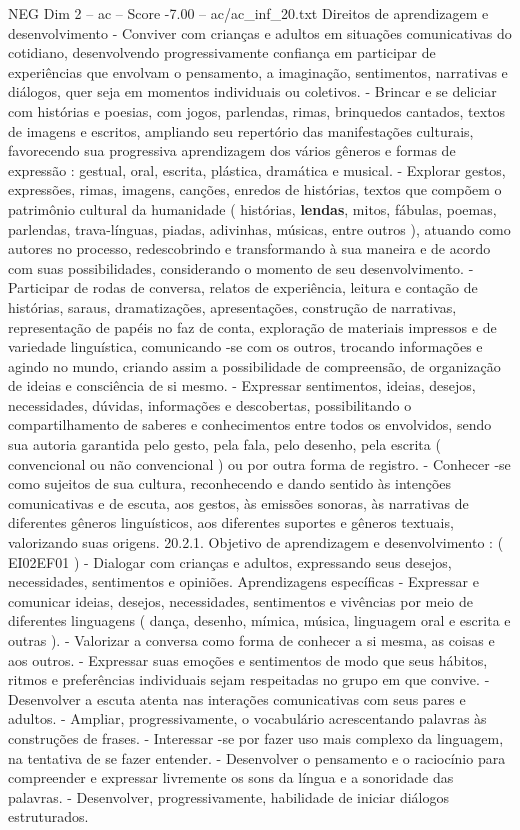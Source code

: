 \begin{textsample}{NEG Dim 2 – ac – Score -7.00 – ac/ac\_inf\_20.txt}
Direitos de aprendizagem e desenvolvimento - Conviver com crianças e adultos em situações comunicativas do cotidiano, desenvolvendo progressivamente confiança em participar de experiências que envolvam o pensamento, a imaginação, sentimentos, narrativas e diálogos, quer seja em momentos individuais ou coletivos. - Brincar e se deliciar com histórias e poesias, com jogos, parlendas, rimas, brinquedos cantados, textos de imagens e escritos, ampliando seu repertório das manifestações culturais, favorecendo sua progressiva aprendizagem dos vários gêneros e formas de expressão : gestual, oral, escrita, plástica, dramática e musical. - Explorar gestos, expressões, rimas, imagens, canções, enredos de histórias, textos que compõem o patrimônio cultural da humanidade ( histórias, \textbf{lendas}, mitos, fábulas, poemas, parlendas, trava-línguas, piadas, adivinhas, músicas, entre outros ), atuando como autores no processo, redescobrindo e transformando à sua maneira e de acordo com suas possibilidades, considerando o momento de seu desenvolvimento. - Participar de rodas de conversa, relatos de experiência, leitura e contação de histórias, saraus, dramatizações, apresentações, construção de narrativas, representação de papéis no faz de conta, exploração de materiais impressos e de variedade linguística, comunicando -se com os outros, trocando informações e agindo no mundo, criando assim a possibilidade de compreensão, de organização de ideias e consciência de si mesmo. - Expressar sentimentos, ideias, desejos, necessidades, dúvidas, informações e descobertas, possibilitando o compartilhamento de saberes e conhecimentos entre todos os envolvidos, sendo sua autoria garantida pelo gesto, pela fala, pelo desenho, pela escrita ( convencional ou não convencional ) ou por outra forma de registro. - Conhecer -se como sujeitos de sua cultura, reconhecendo e dando sentido às intenções comunicativas e de escuta, aos gestos, às emissões sonoras, às narrativas de diferentes gêneros linguísticos, aos diferentes suportes e gêneros textuais, valorizando suas origens. 20.2.1.
Objetivo de aprendizagem e desenvolvimento : ( EI02EF01 ) - Dialogar com crianças e adultos, expressando seus desejos, necessidades, sentimentos e opiniões.
Aprendizagens específicas - Expressar e comunicar ideias, desejos, necessidades, sentimentos e vivências por meio de diferentes linguagens ( dança, desenho, mímica, música, linguagem oral e escrita e outras ). - Valorizar a conversa como forma de conhecer a si mesma, as coisas e aos outros. - Expressar suas emoções e sentimentos de modo que seus hábitos, ritmos e preferências individuais sejam respeitadas no grupo em que convive. - Desenvolver a escuta atenta nas interações comunicativas com seus pares e adultos. - Ampliar, progressivamente, o vocabulário acrescentando palavras às construções de frases. - Interessar -se por fazer uso mais complexo da linguagem, na tentativa de se fazer entender. - Desenvolver o pensamento e o raciocínio para compreender e expressar livremente os sons da língua e a sonoridade das palavras. - Desenvolver, progressivamente, habilidade de iniciar diálogos estruturados.

\end{textsample}
